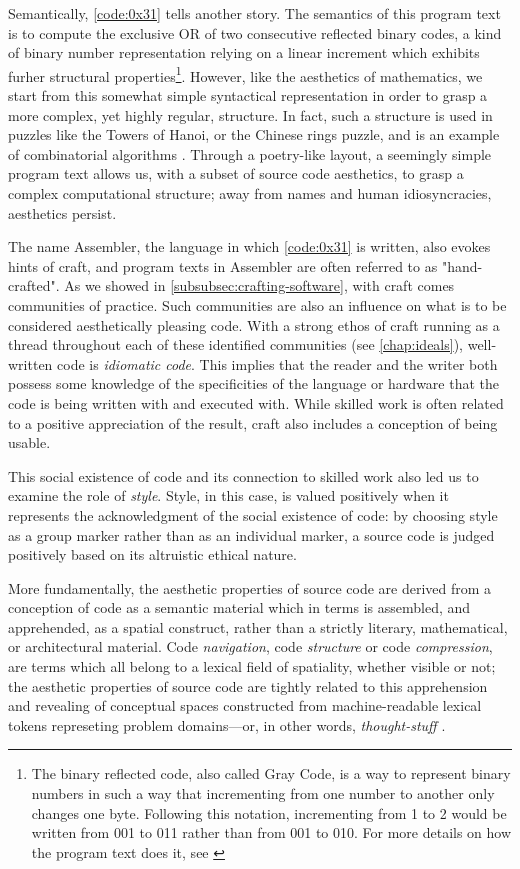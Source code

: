 Semantically, \ref{code:0x31} tells another story. The semantics of this program text is to compute the exclusive OR of two consecutive reflected binary codes, a kind of binary number representation relying on a linear increment which exhibits furher structural properties\footnote{The binary reflected code, also called Gray Code, is a way to represent binary numbers in such a way that incrementing from one number to another only changes one byte. Following this notation, incrementing from 1 to 2 would be written from 001 to 011 rather than from 001 to 010. For more details on how the program text does it, see \citep{sanchez_solutions_2016}}. However, like the aesthetics of mathematics, we start from this somewhat simple syntactical representation in order to grasp a more complex, yet highly regular, structure. In fact, such a structure is used in puzzles like the Towers of Hanoi, or the Chinese rings puzzle, and is an example of combinatorial algorithms \citep{knuth_art_2011}. Through a poetry-like layout, a seemingly simple program text allows us, with a subset of source code aesthetics, to grasp a complex computational structure; away from names and human idiosyncracies, aesthetics persist.

The name Assembler, the language in which \ref{code:0x31} is written, also evokes hints of craft, and program texts in Assembler are often referred to as "hand-crafted". As we showed in \ref{subsubsec:crafting-software}, with craft comes communities of practice. Such communities are also an influence on what is to be considered aesthetically pleasing code.  With a strong ethos of craft running as a thread throughout each of these identified communities (see \ref{chap:ideals}), well-written code is \emph{idiomatic code}. This implies that the reader and the writer both possess some knowledge of the specificities of the language or hardware that the code is being written with and executed with. While skilled work is often related to a positive appreciation of the result, craft also includes a conception of being usable.

This social existence of code and its connection to skilled work also led us to examine the role of \emph{style}. Style, in this case, is valued positively when it represents the acknowledgment of the social existence of code: by choosing style as a group marker rather than as an individual marker, a source code is judged positively based on its altruistic ethical nature.

More fundamentally, the aesthetic properties of source code are derived from a conception of code as a semantic material which in terms is assembled, and apprehended, as a spatial construct, rather than a strictly literary, mathematical, or architectural material. Code \emph{navigation}, code \emph{structure} or code \emph{compression}, are terms which all belong to a lexical field of spatiality, whether visible or not; the aesthetic properties of source code are tightly related to this apprehension and revealing of conceptual spaces constructed from machine-readable lexical tokens represeting problem domains—or, in other words, \emph{thought-stuff} \citep{brooksjr_mythical_1975}.

